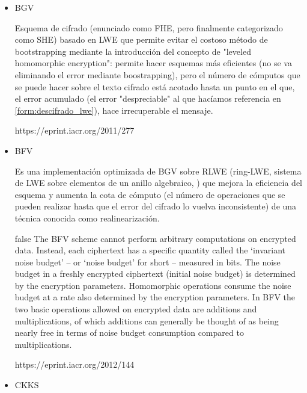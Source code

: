\begin{itemize}

    \item BGV

    Esquema de cifrado (enunciado como FHE, pero finalmente categorizado como SHE) basado en LWE que permite evitar el costoso método de bootstrapping mediante la introducción del concepto de "leveled homomorphic encryption": permite hacer esquemas más eficientes (no se va eliminando el error mediante boostrapping), pero el número de cómputos que se puede hacer sobre el texto cifrado está acotado hasta un punto en el que, el error acumulado (el error "despreciable" al que hacíamos referencia en \ref{form:descifrado_lwe}), hace irrecuperable el mensaje.


    https://eprint.iacr.org/2011/277

    \item BFV

    Es una implementación optimizada de BGV sobre RLWE (ring-LWE, sistema de LWE sobre elementos de un anillo algebraico, \cite{anillo}) que mejora la eficiencia del esquema y aumenta la cota de cómputo (el número de operaciones que se pueden realizar hasta que el error del cifrado lo vuelva inconsistente) de una técnica conocida como realinearización.

    \if false
    The BFV scheme cannot perform arbitrary computations on encrypted data.
        Instead, each ciphertext has a specific quantity called the `invariant noise
        budget' -- or `noise budget' for short -- measured in bits. The noise budget
        in a freshly encrypted ciphertext (initial noise budget) is determined by
        the encryption parameters. Homomorphic operations consume the noise budget
        at a rate also determined by the encryption parameters. In BFV the two basic
        operations allowed on encrypted data are additions and multiplications, of
        which additions can generally be thought of as being nearly free in terms of
        noise budget consumption compared to multiplications.
    \fi

    https://eprint.iacr.org/2012/144


    \item CKKS


\end{itemize}
